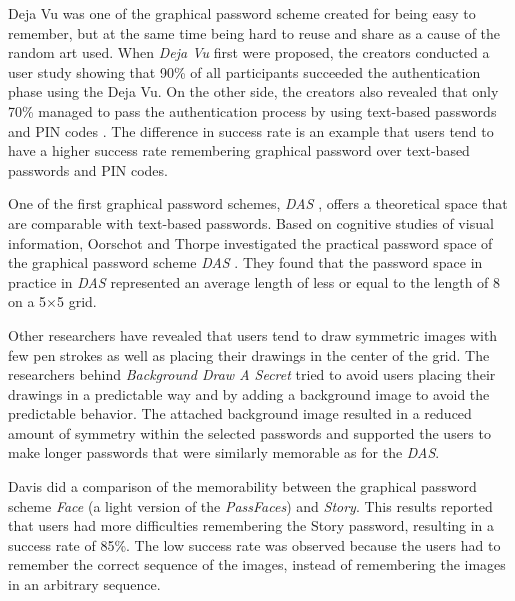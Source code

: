     Deja Vu was one of the graphical password scheme created for being easy to remember, but at the same time being hard to reuse and share as a cause of the random art used. When {\it Deja Vu} first were proposed, the creators conducted a user study showing that 90\% of all participants succeeded the authentication phase using the Deja Vu. On the other side, the creators also revealed that only 70\% managed to pass the authentication process by using text-based passwords and PIN codes \cite{DejaVu}. The difference in success rate is an example that users tend to have a higher success rate remembering graphical password over text-based passwords and PIN codes. 

    One of the first graphical password schemes, {\it DAS} \cite{Jermyn}, offers a theoretical space that are comparable with text-based passwords. Based on cognitive studies of visual information, Oorschot and Thorpe \cite{Thorpe1} investigated the practical password space of the graphical password scheme {\it DAS} \cite{Jermyn}. They found that the password space in practice in {\it DAS} represented an average length of less or equal to the length of 8 on a 5$\times$5 grid. 

    Other researchers have revealed that users tend to draw symmetric images with few pen strokes as well as placing their drawings in the center of the grid. The researchers behind {\it Background Draw A Secret}\cite{BDAS} tried to avoid users placing their drawings in a predictable way and by adding a background image to avoid the predictable behavior. The attached background image resulted in a reduced amount of symmetry within the selected passwords and supported the users to make longer passwords that were similarly memorable as for the {\it DAS}.

    Davis \cite{Davis} did a comparison of the memorability between the graphical password scheme {\it Face} (a light version of the {\it PassFaces}) and {\it Story}. This results reported that users had more difficulties remembering the Story password, resulting in a success rate of  85\%. The low success rate was observed because the users had to remember the correct sequence of the images, instead of remembering the images in an arbitrary sequence. 

